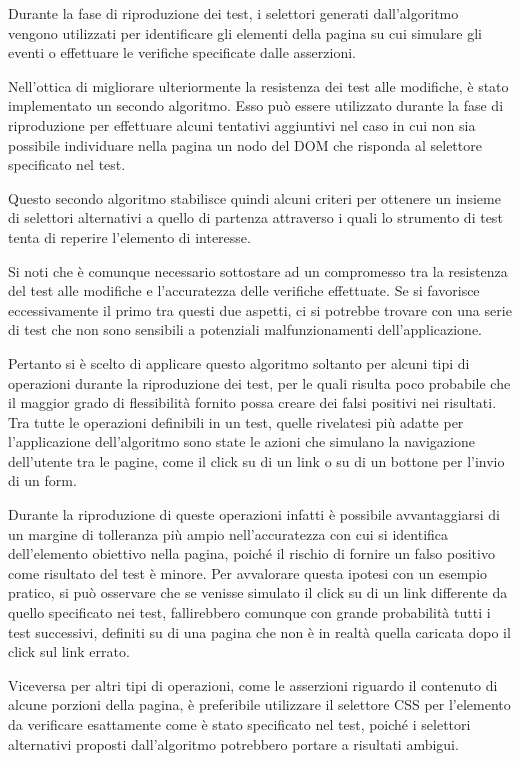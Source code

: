 Durante la fase di riproduzione dei test, i selettori generati dall'algoritmo vengono utilizzati per identificare gli elementi della pagina su cui simulare gli eventi o effettuare le verifiche specificate dalle asserzioni.

Nell'ottica di migliorare ulteriormente la resistenza dei test alle modifiche, è stato implementato un secondo algoritmo. Esso può essere utilizzato durante la fase di riproduzione per effettuare alcuni tentativi aggiuntivi nel caso in cui non sia possibile individuare nella pagina un nodo del DOM che risponda al selettore specificato nel test.

Questo secondo algoritmo stabilisce quindi alcuni criteri per ottenere un insieme di selettori alternativi a quello di partenza attraverso i quali lo strumento di test tenta di reperire l'elemento di interesse. 

Si noti che è comunque necessario sottostare ad un compromesso tra la resistenza del test alle modifiche e l'accuratezza delle verifiche effettuate. Se si favorisce eccessivamente il primo tra questi due aspetti, ci si potrebbe trovare con una serie di test che non sono sensibili a potenziali malfunzionamenti dell'applicazione.

Pertanto si è scelto di applicare questo algoritmo soltanto per alcuni tipi di operazioni durante la riproduzione dei test, per le quali risulta poco probabile che il maggior grado di flessibilità fornito possa creare dei falsi positivi nei risultati. Tra tutte le operazioni definibili in un test, quelle rivelatesi più adatte per l'applicazione dell'algoritmo sono state le azioni che simulano la navigazione dell'utente tra le pagine, come il click su di un link o su di un bottone per l'invio di un form.

Durante la riproduzione di queste operazioni infatti è possibile avvantaggiarsi di un margine di tolleranza più ampio nell'accuratezza con cui si identifica dell'elemento obiettivo nella pagina, poiché il rischio di fornire un falso positivo come risultato del test è minore. Per avvalorare questa ipotesi con un esempio pratico, si può osservare che se venisse simulato il click su di un link differente da quello specificato nei test, fallirebbero comunque con grande probabilità tutti i test successivi, definiti su di una pagina che non è in realtà quella caricata dopo il click sul link errato.

Viceversa per altri tipi di operazioni, come le asserzioni riguardo il contenuto di alcune porzioni della pagina, è preferibile utilizzare il selettore CSS per l'elemento da verificare esattamente come è stato specificato nel test, poiché i selettori alternativi proposti dall'algoritmo potrebbero portare a risultati ambigui.

